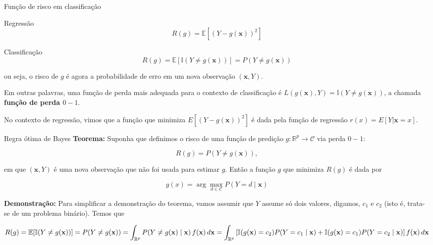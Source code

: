 \documentclass[
  ignorenonframetext,
  aspectratio=169,
]{beamer}
\begin{document}
\begin{frame}{Função de risco em classificação}
\label{funuxe7uxe3o-de-risco-em-classificauxe7uxe3o}
\begin{block}{Regressão}
\label{regressuxe3o-1}
\[
R(g)=\mathbb{E}[(Y-g(\mathbf{x}))^2]
\]
\end{block}

\begin{block}{Classificação}
\label{classificauxe7uxe3o-1}
\[
R(g)= \mathbb{E}[ \mathbb{I}(Y\neq g(\mathbf{x}))] = P(Y\neq g(\mathbf{x}))
\]

ou seja, o risco de \(g\) é agora a probabilidade de erro em um nova
observação \((\mathbf{x},Y)\).

Em outras palavras, uma função de perda mais adequada para o contexto de
classificação é
\(L(g(\mathbf{x}),Y) = \mathbb{I}(Y \neq g(\mathbf{x}))\), a chamada
\textbf{função de perda \(0-1\)}.
\end{block}
\end{frame}

\begin{frame}
No contexto de regressão, vimos que a função que minimiza
\(E[(Y − g(\mathbf{x}))^2]\) é dada pela função de regressão
\(r(x) = E[Y|\mathbf{x} = x]\).

\begin{block}{Regra ótima de Bayes}
\label{regra-uxf3tima-de-bayes}
\textbf{Teorema:} Suponha que definimos o risco de uma função de
predição \(g:\mathbb{R}^p \rightarrow \mathcal{C}\) via perda \(0-1\):

\[
R(g)=P(Y \neq g(\mathbf{x})),
\]

em que \((\mathbf{x},Y)\) é uma nova observação que não foi usada para
estimar \(g\). Então a função \(g\) que minimiza \(R(g)\) é dada por

\[
g(x)=
\arg\max_{d\in\mathcal{C}}
P(Y=d\mid \mathbf{x})
\]
\end{block}
\end{frame}

\begin{frame}
\textbf{Demonstração:} Para simplificar a demonstração do teorema, vamos
assumir que \(Y\) assume só dois valores, digamos, \(c_1\) e \(c_2\)
(isto é, trata-se de um problema binário). Temos que

\[
R(g)
=
\mathbb{E}[\mathbb{I}(Y \neq g(\mathbf{x}))]
=
P(Y \neq g(\mathbf{x}))
=
\int_{\mathbb{R}^p}
P(Y \neq g(\mathbf{x})\mid \mathbf{x})\,f(\mathbf{x})\,d\mathbf{x} \\
=
\int_{\mathbb{R}^p}
\left[
\mathbb{I}(g(\mathbf{x})=c_2)P(Y=c_1\mid \mathbf{x})
+
\mathbb{I}(g(\mathbf{x})=c_1)P(Y=c_2\mid \mathbf{x})
\right]
f(\mathbf{x})\,d\mathbf{x}
\]
\end{frame}
\end{document}
